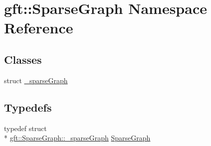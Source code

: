 \hypertarget{namespacegft_1_1SparseGraph}{\section{gft\-:\-:Sparse\-Graph Namespace Reference}
\label{namespacegft_1_1SparseGraph}
}
\subsection*{Classes}
\begin{DoxyCompactItemize}
\item 
struct \hyperlink{structgft_1_1SparseGraph_1_1__sparseGraph}{\-\_\-sparse\-Graph}
\end{DoxyCompactItemize}
\subsection*{Typedefs}
\begin{DoxyCompactItemize}
\item 
typedef struct \\*
\hyperlink{structgft_1_1SparseGraph_1_1__sparseGraph}{gft\-::\-Sparse\-Graph\-::\-\_\-sparse\-Graph} \hyperlink{namespacegft_1_1SparseGraph_ac9894ef1cb4a15f8970806af9f79cc3f}{Sparse\-Graph}
\end{DoxyCompactItemize}
